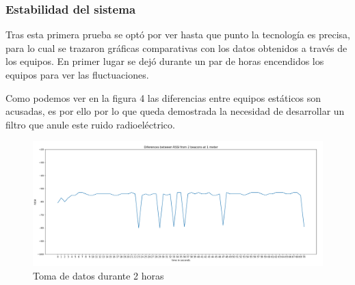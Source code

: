 \documentclass[paper=a4, fontsize=11pt,twoside]{scrartcl}
\begin{document}
        \subsubsection{Estabilidad del sistema}
            Tras esta primera prueba se optó por ver hasta que punto la tecnología es precisa, para lo cual se trazaron gráficas comparativas
            con los datos obtenidos a través de los equipos. En primer lugar se dejó durante un par de horas encendidos los equipos para ver las 
            fluctuaciones.

            Como podemos ver en la figura 4 las diferencias entre equipos estáticos son acusadas, es por ello por lo que queda demostrada la necesidad de
            desarrollar un filtro que anule este ruido radioeléctrico.
            \begin{center}
                \begin{figure}[]
                    \centering
                    \includegraphics[width=1\textwidth]{../../Memmory/images/5min_beacon_rssi.PNG}
                    \caption{Toma de datos durante 2 horas}
                    \label{fig:mesh15}
                \end{figure}
            \end{center}
\end{document}
